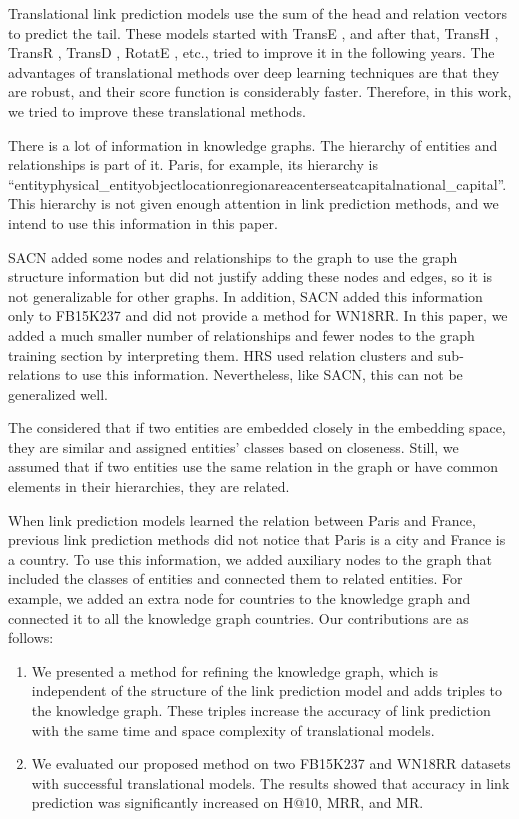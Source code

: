 \documentclass{article} \usepackage{iclr2022_conference,times}
\begin{document}
Translational link prediction models use the sum of the head and relation vectors to predict the tail. These models started with TransE \citep{bordes2013translating}, and after that, TransH \citep{transh}, TransR \citep{lin2015learning}, TransD \citep{ji2015knowledge}, RotatE \citep{rotate}, etc., tried to improve it in the following years. The advantages of translational methods over deep learning techniques are that they are robust, and their score function is considerably faster. Therefore, in this work, we tried to improve these translational methods.

\indent There is a lot of information in knowledge graphs. The hierarchy of entities and relationships is part of it. Paris, for example, its hierarchy is ``entityphysical\_entityobjectlocationregionareacenterseatcapitalnational\_capital''. This hierarchy is not given enough attention in link prediction methods, and we intend to use this information in this paper.

\indent SACN \citep{sacn_paper} added some nodes and relationships to the graph to use the graph structure information but did not justify adding these nodes and edges, so it is not generalizable for other graphs. In addition, SACN added this information only to FB15K237 and did not provide a method for WN18RR. In this paper, we added a much smaller number of relationships and fewer nodes to the graph training section by interpreting them. HRS \citep{zhang2018knowledge} used relation clusters and sub-relations to use this information. Nevertheless, like SACN, this can not be generalized well.

The \citep{moon2017learning} considered that if two entities are embedded closely in the embedding space, they are similar and assigned entities' classes based on closeness. Still, we assumed that if two entities use the same relation in the graph or have common elements in their hierarchies, they are related. 

When link prediction models learned the relation between Paris and France, previous link prediction methods did not notice that Paris is a city and France is a country. To use this information, we added auxiliary nodes to the graph that included the classes of entities and connected them to related entities. For example, we added an extra node for countries to the knowledge graph and connected it to all the knowledge graph countries. Our contributions are as follows:
\begin{enumerate}
	\item[]  We presented a method for refining the knowledge graph, which is independent of the structure of the link prediction model and adds triples to the knowledge graph. These triples increase the accuracy of link prediction with the same time and space complexity of translational models.
	\item[]  We evaluated our proposed method on two FB15K237 and WN18RR datasets with successful translational models. The results showed that accuracy in link prediction was significantly increased on H@10, MRR, and MR.
  \end{enumerate}
\end{document}
